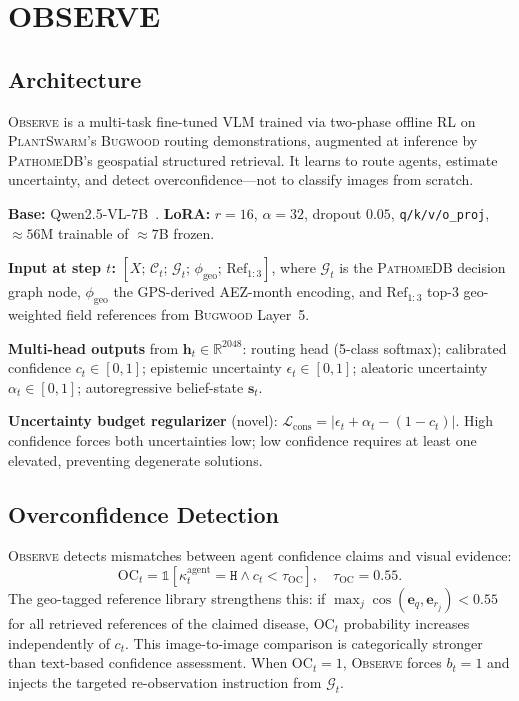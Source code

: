\documentclass[11pt,twocolumn]{article}
\newcommand{\observe}{\textsc{Observe}\xspace}
\newcommand{\plantswarm}{\textsc{PlantSwarm}\xspace}
\newcommand{\pathomedb}{\textsc{PathomeDB}\xspace}
\newcommand{\kH}{\texttt{H}\xspace}
\newcommand{\bugwood}{\textsc{Bugwood}\xspace}
\begin{document}
\section{OBSERVE}
\label{sec:observe}

\subsection{Architecture}

\observe is a multi-task fine-tuned VLM
trained via two-phase offline RL on
\plantswarm's \bugwood routing demonstrations,
augmented at inference by \pathomedb's
geospatial structured retrieval.
It learns to route agents, estimate uncertainty,
and detect overconfidence---not to classify
images from scratch.

\textbf{Base:} Qwen2.5-VL-7B~\citep{qwen2vl}.
\textbf{LoRA:} $r{=}16$, $\alpha{=}32$,
dropout $0.05$, \texttt{q/k/v/o\_proj},
${\approx}56$M trainable of ${\approx}7$B frozen.

\textbf{Input at step $t$:}
$[X;\,\mathcal{C}_t;\,\mathcal{G}_t;\,
\phi_\text{geo};\,\mathrm{Ref}_{1:3}]$,
where $\mathcal{G}_t$ is the \pathomedb
decision graph node, $\phi_\text{geo}$
the GPS-derived AEZ-month encoding,
and $\mathrm{Ref}_{1:3}$ top-3
geo-weighted field references from
\bugwood Layer~5.

\textbf{Multi-head outputs} from
$\mathbf{h}_t \in \mathbb{R}^{2048}$:
routing head (5-class softmax);
calibrated confidence $c_t \in [0,1]$;
epistemic uncertainty $\epsilon_t \in [0,1]$;
aleatoric uncertainty $\alpha_t \in [0,1]$;
autoregressive belief-state $\mathbf{s}_t$.

\textbf{Uncertainty budget regularizer}
(novel): $\mathcal{L}_\text{cons}{=}
|\epsilon_t {+} \alpha_t {-} (1{-}c_t)|$.
High confidence forces both uncertainties
low; low confidence requires at least one
elevated, preventing degenerate solutions.

\subsection{Overconfidence Detection}

\observe detects mismatches between agent
confidence claims and visual evidence:
\begin{equation}
  \mathrm{OC}_t = \mathbb{1}[\kappa^\text{agent}_t
  {=}\kH \wedge c_t < \tau_{\mathrm{OC}}],
  \quad \tau_{\mathrm{OC}}{=}0.55.
  \label{eq:oc}
\end{equation}
The geo-tagged reference library strengthens
this: if $\max_j\cos(\mathbf{e}_q,
\mathbf{e}_{r_j}) < 0.55$ for all retrieved
references of the claimed disease,
$\mathrm{OC}_t$ probability increases
independently of $c_t$. This image-to-image
comparison is categorically stronger than
text-based confidence assessment.
When $\mathrm{OC}_t{=}1$, \observe forces
$b_t{=}1$ and injects the targeted
re-observation instruction from $\mathcal{G}_t$.
\end{document}
